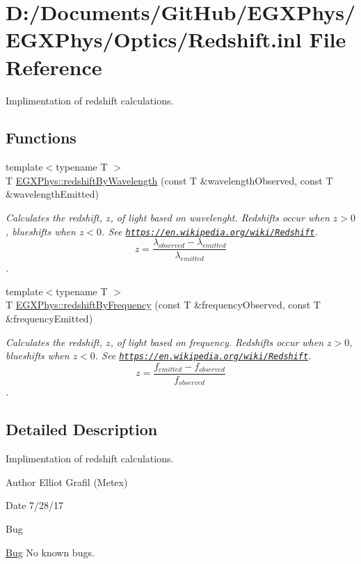 \hypertarget{_redshift_8inl}{}\section{D\+:/\+Documents/\+Git\+Hub/\+E\+G\+X\+Phys/\+E\+G\+X\+Phys/\+Optics/\+Redshift.inl File Reference}
\label{_redshift_8inl}


Implimentation of redshift calculations.  


\subsection*{Functions}
\begin{DoxyCompactItemize}
\item 
{\footnotesize template$<$typename T $>$ }\\T \hyperlink{group___optics_ga29300a13e34da35332ca2d447b5ce82d}{E\+G\+X\+Phys\+::redshift\+By\+Wavelength} (const T \&wavelength\+Observed, const T \&wavelength\+Emitted)
\begin{DoxyCompactList}\small\item\em Calculates the redshift, $z$, of light based on wavelenght. Redshifts occur when $z > 0$, blueshifts when $z < 0$. See \href{https://en.wikipedia.org/wiki/Redshift}{\tt https\+://en.\+wikipedia.\+org/wiki/\+Redshift}. \[z=\frac{\lambda_{observed}-\lambda_{emitted}}{\lambda_{emitted}}\]. \end{DoxyCompactList}\item 
{\footnotesize template$<$typename T $>$ }\\T \hyperlink{group___optics_gacc6d3b2922061214d64b89a4b8e3967a}{E\+G\+X\+Phys\+::redshift\+By\+Frequency} (const T \&frequency\+Observed, const T \&frequency\+Emitted)
\begin{DoxyCompactList}\small\item\em Calculates the redshift, $z$, of light based on frequency. Redshifts occur when $z > 0$, blueshifts when $z < 0$. See \href{https://en.wikipedia.org/wiki/Redshift}{\tt https\+://en.\+wikipedia.\+org/wiki/\+Redshift}. \[z=\frac{f_{emitted}-f_{observed}}{f_{observed}}\]. \end{DoxyCompactList}\end{DoxyCompactItemize}


\subsection{Detailed Description}
Implimentation of redshift calculations. 

\begin{DoxyAuthor}{Author}
Elliot Grafil (Metex) 
\end{DoxyAuthor}
\begin{DoxyDate}{Date}
7/28/17 
\end{DoxyDate}
\begin{DoxyRefDesc}{Bug}
\item[\hyperlink{bug__bug000044}{Bug}]No known bugs. \end{DoxyRefDesc}
